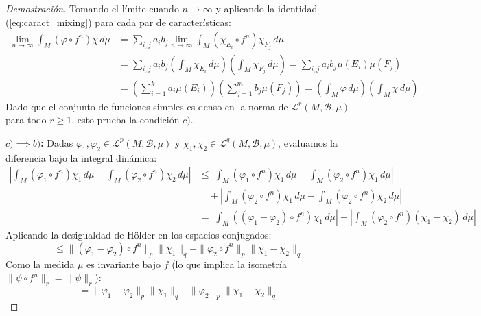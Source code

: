 \begin{proof}[Demostración]
	Tomando el límite cuando $n \to \infty$ y aplicando la identidad (\ref{eq:caract_mixing}) para cada par de características:
	\begin{align*}
		\lim_{n \to \infty} \int_M (\varphi \circ f^n)\chi \, d\mu &= \sum_{i,j} a_i b_j \lim_{n \to \infty} \int_M (\chi_{E_i} \circ f^n)\chi_{F_j} \, d\mu \\
		&= \sum_{i,j} a_i b_j \left( \int_M \chi_{E_i} \, d\mu \right) \left( \int_M \chi_{F_j} \, d\mu \right) = \sum_{i,j} a_i b_j \mu(E_i)\mu(F_j) \\
		&= \left( \sum_{i=1}^{k} a_i \mu(E_i) \right) \left( \sum_{j=1}^{m} b_j \mu(F_j) \right) = \left( \int_M \varphi \, d\mu \right) \left( \int_M \chi \, d\mu \right)
	\end{align*}
	Dado que el conjunto de funciones simples es denso en la norma de $\mathcal{L}^r(M, \mathcal{B}, \mu)$ para todo $r \ge 1$, esto prueba la condición $c)$.
	
	\textbf{$c) \implies b)$:}
	Dadas $\varphi_1, \varphi_2 \in \mathcal{L}^p(M, \mathcal{B}, \mu)$ y $\chi_1, \chi_2 \in \mathcal{L}^q(M, \mathcal{B}, \mu)$, evaluamos la diferencia bajo la integral dinámica:
	\begin{align*}
		\left| \int_M (\varphi_1 \circ f^n)\chi_1 \, d\mu - \int_M (\varphi_2 \circ f^n)\chi_2 \, d\mu \right| &\le \left| \int_M (\varphi_1 \circ f^n)\chi_1 \, d\mu - \int_M (\varphi_2 \circ f^n)\chi_1 \, d\mu \right| \\
		&\quad + \left| \int_M (\varphi_2 \circ f^n)\chi_1 \, d\mu - \int_M (\varphi_2 \circ f^n)\chi_2 \, d\mu \right| \\
		&= \left| \int_M ((\varphi_1 - \varphi_2)\circ f^n)\chi_1 \, d\mu \right| + \left| \int_M (\varphi_2 \circ f^n)(\chi_1 - \chi_2) \, d\mu \right|
	\end{align*}
	Aplicando la desigualdad de Hölder en los espacios conjugados:
	$$ \le \|(\varphi_1 - \varphi_2)\circ f^n\|_p \|\chi_1\|_q + \|\varphi_2 \circ f^n\|_p \|\chi_1 - \chi_2\|_q $$
	Como la medida $\mu$ es invariante bajo $f$ (lo que implica la isometría $\|\psi \circ f^n\|_r = \|\psi\|_r$):
	\begin{equation}
		= \|\varphi_1 - \varphi_2\|_p \|\chi_1\|_q + \|\varphi_2\|_p \|\chi_1 - \chi_2\|_q \label{eq:cota_I}
	\end{equation}
	

\end{proof}
